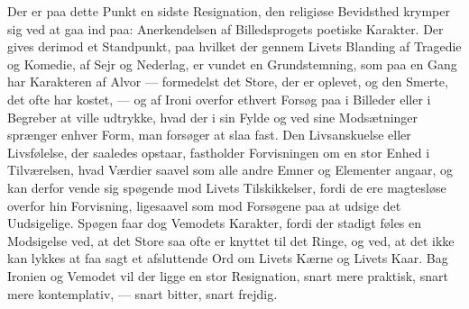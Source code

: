 \documentclass[12pt,a4paper]{book}
\newcommand{\opage}[1]{\marginnote{\footnotesize\textit{[#1]}}}
\begin{document}
Der er paa dette Punkt en sidste Resignation, den religiøse Bevidsthed krymper sig ved at gaa
ind paa: Anerkendelsen af Billedsprogets poetiske Karakter. Der gives derimod et Standpunkt,
paa hvilket der gennem Livets Blanding af Tragedie og Komedie, af Sejr og Nederlag, er vundet
en Grundstemning, som paa en Gang har Karakteren af Alvor --- formedelst det Store, der er
oplevet, og den \opage{378} Smerte, det ofte har kostet, --- og af Ironi overfor ethvert Forsøg paa i
Billeder eller i Begreber at ville udtrykke, hvad der i sin Fylde og ved sine Modsætninger
sprænger enhver Form, man forsøger at slaa fast. Den Livsanskuelse eller Livsfølelse, der
saaledes opstaar, fastholder Forvisningen om en stor Enhed i Tilværelsen, hvad Værdier saavel
som alle andre Emner og Elementer angaar, og kan derfor vende sig spøgende mod Livets
Tilskikkelser, fordi de ere magtesløse overfor hin Forvisning, ligesaavel som mod Forsøgene
paa at udsige det Uudsigelige. Spøgen faar dog Vemodets Karakter, fordi der stadigt føles en
Modsigelse ved, at det Store saa ofte er knyttet til det Ringe, og ved, at det ikke kan
lykkes at faa sagt et afsluttende Ord om Livets Kærne og Livets Kaar. Bag Ironien og Vemodet
vil der ligge en stor Resignation, snart mere praktisk, snart mere kontemplativ, --- snart
bitter, snart frejdig.
\end{document}
